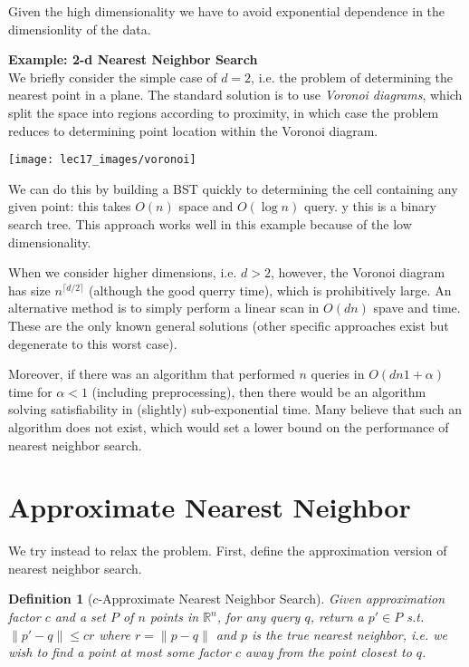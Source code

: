 \documentclass[11pt]{article}
\newtheorem{definition}[theorem]{Definition}
\begin{document}
Given the high dimensionality we have to avoid exponential dependence in the dimensionlity of the data.


\textbf{Example: 2-d Nearest Neighbor Search}\\
We briefly consider the simple case of $d=2$, i.e. the problem of determining the nearest point in a plane. The standard solution is to use \emph{Voronoi diagrams}, which split the space into regions according to proximity, in which case the problem reduces to determining point location within the Voronoi diagram. 
\begin{center}
    \texttt{[image: lec17\_images/voronoi]}
\end{center}

We can do this by building a BST quickly to determining the cell containing any given point: this takes $O(n)$ space and $O(\log n)$ query.
y this is a binary search tree. This approach works well in this example because of the low dimensionality.


When we consider higher dimensions, i.e. $d > 2$, however, the Voronoi diagram has size $n^{\lceil d/2 \rceil}$ (although the good querry time), which is prohibitively large.
An alternative method is to simply perform a linear scan in $O(dn)$ spave and time. These are the only known general solutions (other specific approaches exist but degenerate to this worst case).

Moreover, if there was an algorithm that performed $n$ queries in $O(dn1+\alpha )$ time for $\alpha<1$ (including preprocessing), then there would be an algorithm solving satisfiability in (slightly) sub-exponential time. Many believe that such an algorithm does not exist, which would set a lower bound on the performance of nearest neighbor search. 



\section{Approximate Nearest Neighbor}


We try instead to relax the problem. First, define the approximation version of nearest neighbor search.

\begin{definition}[$c$-Approximate Nearest Neighbor Search]
    Given approximation factor $c$ and a set $P$ of $n$ points in $\mathbb{R}^n$, for any query $q$, return a $p' \in P$ s.t. $\| p'-q \| \leq cr$ where $r = \| p-q \|$ and $p$ is the true nearest neighbor, i.e. we wish to find a point at most some factor $c$ away from the point closest to $q$.
\end{definition}
\end{document}
